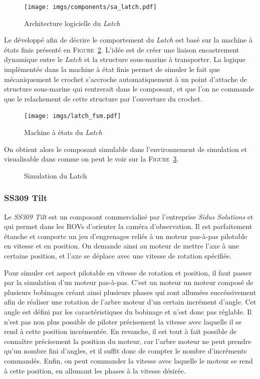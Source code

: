 				\begin{figure}[!htb]
					\centering
					\texttt{[image: imgs/components/sa\_latch.pdf]}
					\caption{Architecture logicielle du \textit{Latch}}
					\label{fig:sa_latch}
				\end{figure}
							
				Le \plugin{} \gazebo{} développé afin de décrire le comportement du \textit{Latch} est basé sur la machine à états finis présenté en \textsc{Figure}~\ref{fig:latch_fsm}. L'idée est de créer une liaison encastrement dynamique entre le \textit{Latch} et la structure sous-marine à transporter. La logique implémentée dans la machine à état finis permet de simuler le fait que mécaniquement le crochet s'accroche automatiquement à un point d'attache de structure sous-marine qui rentrerait dans le composant, et que l'on ne commande que le relachement de cette structure par l'ouverture du crochet.

				\begin{figure}[!htb]
					\centering
					\texttt{[image: imgs/latch\_fsm.pdf]}
					\caption{Machine à états du \textit{Latch}}
					\label{fig:latch_fsm}
				\end{figure}

				On obtient alors le composant simulable dans l'environnement de simulation \gazebo{} et visualisable dans \rviz{} comme on peut le voir sur la \textsc{Figure}~\ref{fig:latch_gazebo_rviz}.

				\begin{figure}[!htb]
					\centering
					\caption{Simulation du Latch}
					\label{fig:latch_gazebo_rviz}
				\end{figure}
		
			\subsubsection{SS309 Tilt}

				Le \textit{SS309 Tilt} est un composant commercialisé par l'entreprise \textit{Sidus Solutions} et qui permet dans les \gls{ROV}s d'orienter la caméra d'observation. Il est parfaitement étanche et comporte un jeu d'engrenages reliés à un moteur pas-à-pas pilotable en vitesse et en position. On demande ainsi au moteur de mettre l'axe à une certaine position, et l'axe se déplace avec une vitesse de rotation spécifiée.
			
				Pour simuler cet aspect pilotable en vitesse de rotation et position, il faut passer par la simulation d'un moteur pas-à-pas. C'est un moteur un moteur composé de plusieurs bobinages créant ainsi plusieurs phases qui sont allumées succéssivement afin de réaliser une rotation de l'arbre moteur d'un certain incrément d'angle. Cet angle est défini par les caractéristiques du bobinage et n'est donc pas réglable. Il n'est pas non plus possible de piloter précisement la vitesse avec laquelle il se rend à cette position incrémentée. En revanche, il est tout à fait possible de connaître précisement la position du moteur, car l'arbre moteur ne peut prendre qu'un nombre fini d'angles, et il suffit donc de compter le nombre d'incréments commandés. Enfin, on peut commander la vitesse avec laquelle le moteur se rend à cette position, en allumant les phases à la vitesse désirée.

